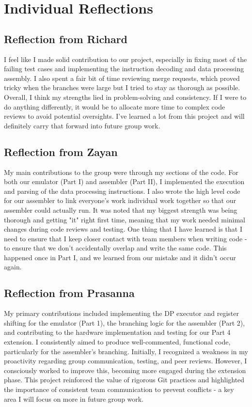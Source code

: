 \documentclass[11pt]{article}
\begin{document}
\section{Individual Reflections}
\subsection{Reflection from Richard}
I feel like I made solid contribution to our project, especially in fixing most of the failing test cases and implementing the 
instruction decoding and data processing assembly. I also spent a fair bit of time reviewing merge requests, which proved tricky 
when the branches were large but I tried to stay as thorough as possible. Overall, I think my strengths lied in problem-solving and 
consistency. If I were to do anything differently, it would be to allocate more time to complex code 
reviews to avoid potential oversights. I've learned a lot from this project and will definitely carry that forward into future group work.

\subsection{Reflection from Zayan}
My main contributions to the group were through my sections of the code. For both our emulator (Part I) and assembler (Part II), I implemented the 
execution and parsing of the data processing instructions. I also wrote the high level code for our assembler to link everyone's work individual work 
together so that our assembler could actually run. It was noted that my biggest strength was being thorough and getting "it" right first time, meaning that 
my work needed minimal changes during code reviews and testing. One thing that I have learned is that I need to ensure that I keep closer contact with 
team members when writing code - to ensure that we don't accidentally overlap and write the same code. This happened once in Part I, and we learned from our 
mistake and it didn't occur again.

\subsection{Reflection from Prasanna}
My primary contributions included implementing the DP executor and register shifting for the emulator (Part 1), the branching logic for the assembler (Part 2), and contributing to the hardware implementation and testing for our Part 4 extension. I consistently aimed to produce well-commented, functional code, particularly for the assembler's branching. Initially, I recognized a weakness in my proactivity regarding group communication, testing, and peer reviews. However, I consciously worked to improve this, becoming more engaged during the extension phase. This project reinforced the value of rigorous Git practices and highlighted the importance of consistent team communication to prevent conflicts - a key area I will focus on more in future group work.
\end{document}
